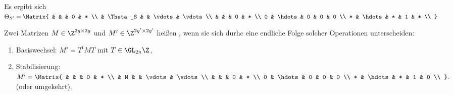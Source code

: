 Es ergibt sich
\begin{math}
    \Theta_{S'} =
    \Matrix{
        & & & 0 & * \\
        & \Theta_S & & \vdots & \vdots \\
        & & & 0 & * \\
        0 & \hdots & 0 & 0 & 0 \\
        * & \hdots & * & 1 & * \\
    }
\end{math}

\begin{df}
    Zwei Matrizen $M \in \Z^{2g \times 2g}$ und $M' \in \Z^{2g' \times 2g'}$ heißen , wenn sie sich durhc eine endliche Folge solcher Operationen unterscheiden:
    \begin{enumerate}[1)]
        \item
            Basiswechsel: $M' = T^t M T$ mit $T \in \GL_{2n} \Z$,
        \item
            Stabilisierung:
            \begin{math}
                M' =
                \Matrix{
                    &  &  &  0 & * \\
                    & M & & \vdots & \vdots \\
                    & & & 0 & * \\
                    0 & \hdots & 0 & 0 & 0 \\
                    * & \hdots & * & 1 & 0 \\
                }.
            \end{math}
            (oder umgekehrt).
    \end{enumerate}
\end{df}

